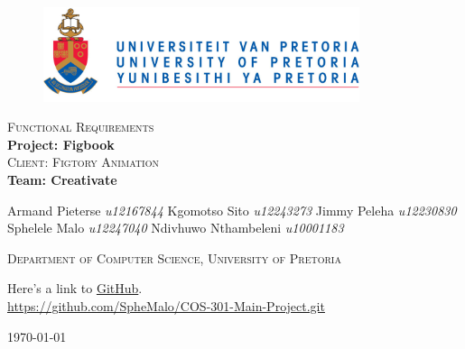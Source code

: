 \begin{titlepage}
	\begin{center}
		
		\begin{figure}[t]
			\centering
			\includegraphics[width=350px]{images/UP_Logo.png}
		\end{figure}
		
		\textsc{\large Functional Requirements} \\ 
		\vspace{2cm}
		\textbf{\Huge Project: Figbook} \\ 
		\textsc{\large Client: Figtory Animation} \\ 
		\vspace{2cm}
		\textbf{\Huge Team: Creativate } \\ 
		
		\begin{flushright} \large
			Armand Pieterse \emph{u12167844} \newline
			Kgomotso Sito 		\emph{u12243273} \newline
			Jimmy Peleha		\emph{u12230830} \newline
			Sphelele Malo 	\emph{u12247040} \newline
			Ndivhuwo Nthambeleni 	\emph{u10001183} \newline
			\end{flushright}
		\textsc{\small Department of Computer Science, University of Pretoria}
		
		\vfill
		
	Here's a link to \href{https://github.com/SpheMalo/COS-301-Main-Project.git}{GitHub}.\\
	\url{https://github.com/SpheMalo/COS-301-Main-Project.git}

	\vfill

	{\large \today}	
	
		
		
	\end{center}
\end{titlepage}
